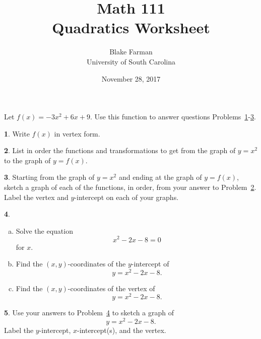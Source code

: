\documentclass[12pt]{amsart}
\author[Blake Farman]{Blake Farman\\University of South Carolina}
\title[Quadratic Worksheet]{Math 111\\Quadratics Worksheet}
\date{November 28, 2017}
\theoremstyle{definition}
\newtheorem{thm}{}
\begin{document}
\maketitle

\vspace{0.2in}
\vspace{0.2in}

Let $f(x) = -3x^2 + 6x + 9$.
Use this function to answer questions Problems~\ref{problem: vertex form}-\ref{problem: graphs}.
\begin{thm}\label{problem: vertex form}
    Write $f(x)$ in vertex form.
    \vspace{2in}
\end{thm}

\begin{thm}\label{problem: functions and transformations}
    List in order the functions and transformations to get from the graph of $y = x^2$ to the graph of $y = f(x)$.
\end{thm}

\newpage

\begin{thm}\label{problem: graphs}
  Starting from the graph of $y = x^2$ and ending at the graph of $y = f(x)$, sketch a graph of each of the functions, in order, from your answer to Problem~\ref{problem: functions and transformations}.
  Label the vertex and $y$-intercept on each of your graphs.
\end{thm}

\newpage

\begin{thm}\label{problem: quick and dirty}
  \begin{enumerate}[(a)]
  \item\label{quick and dirty: roots}
    Solve the equation
    $$x^2 - 2x - 8 = 0$$
    for $x$.
    \vspace{2in}
  \item\label{quick and dirty: y-intercept}
    Find the $(x,y)$-coordinates of the $y$-intercept of
    $$y = x^2 - 2x - 8.$$
    \vspace{2in}
  \item\label{quick and dirty: vertex}
    Find the $(x,y)$-coordinates of the vertex of
    $$y = x^2 - 2x - 8.$$
  \end{enumerate}
\end{thm}

\newpage

\begin{thm}\label{problem: graph quick and dirty}
  Use your answers to Problem~\ref{problem: quick and dirty} to sketch a graph of
  $$y = x^2 - 2x - 8 .$$
  Label the $y$-intercept, $x$-intercept(s), and the vertex.
\end{thm}
\end{document}
